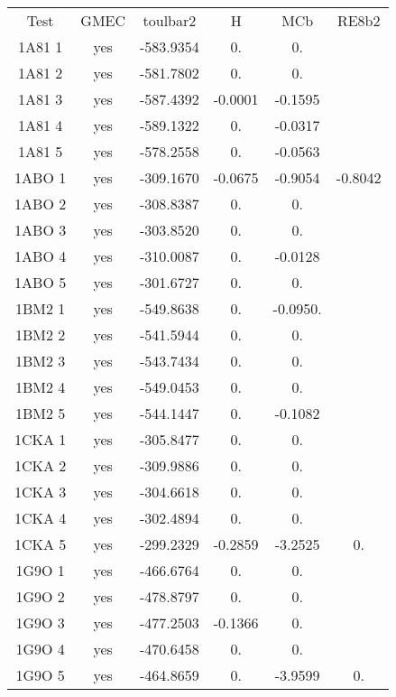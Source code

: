     \begin{table}[h]
      \centering

      \begin{tabular}{cccccc}


        \toprule
        Test & GMEC & toulbar2 & H & MCb & RE8b2 \\
        \cmidrule{1-6}
        1A81 1 & yes & -583.9354 & 0. & 0. & \\
        1A81 2 & yes & -581.7802 & 0. & 0. & \\
        1A81 3 & yes & -587.4392 & -0.0001 & -0.1595 & \\
        1A81 4 & yes & -589.1322 & 0. & -0.0317 & \\
        1A81 5 & yes & -578.2558 & 0. & -0.0563 & \\
        1ABO 1 & yes & -309.1670 & -0.0675 & -0.9054 & -0.8042\\
        1ABO 2 & yes & -308.8387 & 0. & 0. & \\
        1ABO 3 & yes & -303.8520 & 0. & 0. & \\
        1ABO 4 & yes & -310.0087 & 0. & -0.0128 & \\
        1ABO 5 & yes & -301.6727 & 0. & 0. & \\
        1BM2 1 & yes & -549.8638 & 0. & -0.0950. & \\
        1BM2 2 & yes & -541.5944 & 0. & 0. & \\
        1BM2 3 & yes & -543.7434 & 0. & 0. & \\
        1BM2 4 & yes & -549.0453 & 0. & 0. & \\
        1BM2 5 & yes & -544.1447 & 0. & -0.1082 & \\
        1CKA 1 & yes & -305.8477 & 0. & 0. & \\
        1CKA 2 & yes & -309.9886 & 0. & 0. & \\
        1CKA 3 & yes & -304.6618 & 0. & 0. & \\
        1CKA 4 & yes & -302.4894 & 0. & 0. & \\
        1CKA 5 & yes & -299.2329 & -0.2859 & -3.2525 & 0. \\
        1G9O 1 & yes & -466.6764 & 0. & 0. & \\
        1G9O 2 & yes & -478.8797 & 0. & 0. & \\
        1G9O 3 & yes & -477.2503 & -0.1366 & 0. & \\
        1G9O 4 & yes & -470.6458 & 0. & 0. & \\
        1G9O 5 & yes & -464.8659 & 0. & -3.9599 & 0.\\

\end{tabular}
\end{table}

